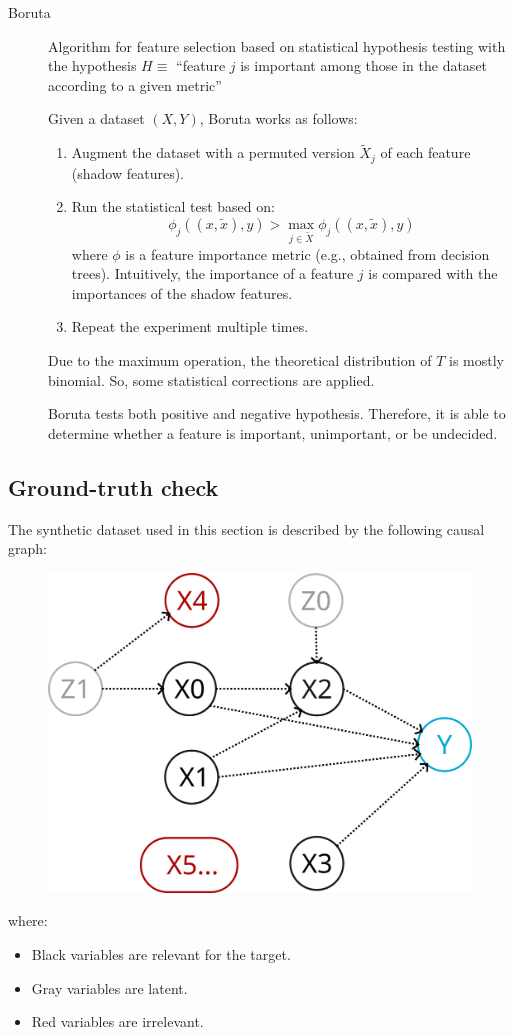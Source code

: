 \begin{description}
    \item[Boruta] 
        Algorithm for feature selection based on statistical hypothesis testing with the hypothesis $H \equiv$ ``feature $j$ is important among those in the dataset according to a given metric''

        Given a dataset $(X, Y)$, Boruta works as follows:
        \begin{enumerate}
            \item Augment the dataset with a permuted version $\tilde{X}_j$ of each feature (shadow features).
            \item Run the statistical test based on:
            \[ \phi_j((x, \tilde{x}), y) > \max_{j \in \tilde{X}} \phi_j((x, \tilde{x}), y) \]
            where $\phi$ is a feature importance metric (e.g., obtained from decision trees). Intuitively, the importance of a feature $j$ is compared with the importances of the shadow features.
            \item Repeat the experiment multiple times.
        \end{enumerate}

        \begin{remark}
            Due to the maximum operation, the theoretical distribution of $T$ is mostly binomial. So, some statistical corrections are applied.
        \end{remark}

        \begin{remark}
            Boruta tests both positive and negative hypothesis. Therefore, it is able to determine whether a feature is important, unimportant, or be undecided.
        \end{remark}
\end{description}


\subsection{Ground-truth check}

The synthetic dataset used in this section is described by the following causal graph:
\begin{figure}[H]
    \centering
    \includegraphics[width=0.3\linewidth]{./img/biomed_causal_graph.png}
\end{figure}
where:
\begin{itemize}
    \item Black variables are relevant for the target.
    \item Gray variables are latent.
    \item Red variables are irrelevant.
\end{itemize}

